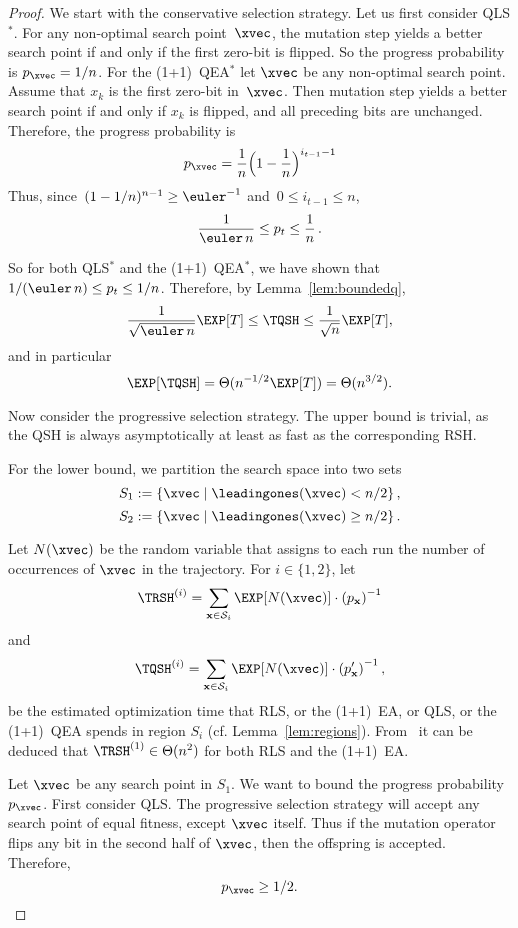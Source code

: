 \begin{proof}
  We start with the conservative selection strategy. Let us first
  consider QLS$^*$. For any non-optimal search point~$\xvec$, the
  mutation step yields a better search point if and only if the first
  zero-bit is flipped. So the progress probability is $p_{\xvec} =
  1/n$. For the (1+1)~QEA$^*$ let $\xvec$ be any non-optimal search
  point. Assume that $x_k$ is the first zero-bit in~$\xvec$. Then
  mutation step yields a better search point if and only if $x_k$ is
  flipped, and all preceding bits are unchanged. Therefore, the
  progress probability is
  \[
  p_{\xvec} = \frac{1}{n}\Big(1-\frac{1}{n}\Big)^{i_{t-1}-1}
  \]
  Thus, since~$(1-1/n)^{n-1}\ge\euler^{-1}$ and~$0\le i_{t-1}\le n$,
  \[
  \frac{1}{\euler\,n}\le p_t\le\frac{1}{n}\,.
  \]
  
  So for both QLS$^*$ and the (1+1)~QEA$^*$, we have shown that
  $1/(\euler\,n)\le p_t\le 1/n$.  Therefore, by
  Lemma~\ref{lem:boundedq},
  \[
  \frac{1}{\sqrt{\euler\,n}}\EXP[T]\le \TQSH \le \frac{1}{\sqrt{n}}\EXP[T],
  \]
  and in particular
  \[
  \EXP[\TQSH] = \Theta(n^{-1/2}\EXP[T]) = \Theta(n^{3/2}).
  \]

  Now consider the progressive selection strategy. The upper bound is
  trivial, as the QSH is always asymptotically at least as fast as
  the corresponding RSH.

  For the lower bound, we partition the search space into two sets 
  \[
  S_1 := \left\{\xvec \mid \leadingones(\xvec) < n/2 \right\},
  \]
  \[
  S_2 := \left\{\xvec \mid \leadingones(\xvec) \geq n/2 \right\}.
  \]

  Let $N(\xvec)$ be the random variable that assigns to each run the
  number of occurrences of $\xvec$ in the trajectory. For
  $i\in\{1,2\}$, let
  \[
  \TRSH^{(i)} = \sum_{\mathbf{x}\in\mathcal{S}_i} \EXP[N(\xvec )]
  \cdot \left(p_{\mathbf{x}}\right)^{-1}
  \]
  and 
  \[
  \TQSH^{(i)} = \sum_{\mathbf{x}\in\mathcal{S}_i} \EXP[N(\xvec )]
  \cdot \left(p'_{\mathbf{x}}\right)^{-1},
  \]
  be the estimated optimization time that RLS, or the (1+1)~EA, or
  QLS, or the (1+1)~QEA spends in region $S_i$
  (cf. Lemma~\ref{lem:regions}).  From~\cite{DJWoneone} it can be
  deduced that $\TRSH^{(1)} \in \Theta(n^2)$ for both RLS and the
  (1+1)~EA.

  Let $\xvec$ be any search point in $S_1$. We want to bound the
  progress probability $p_{\xvec}$. First consider QLS. The
  progressive selection strategy will accept any search point of equal
  fitness, except $\xvec$ itself. Thus if the mutation operator flips
  any bit in the second half of $\xvec$, then the offspring is
  accepted. Therefore,
  \[
  p_{\xvec} \geq 1/2.
  \]


\end{proof}
